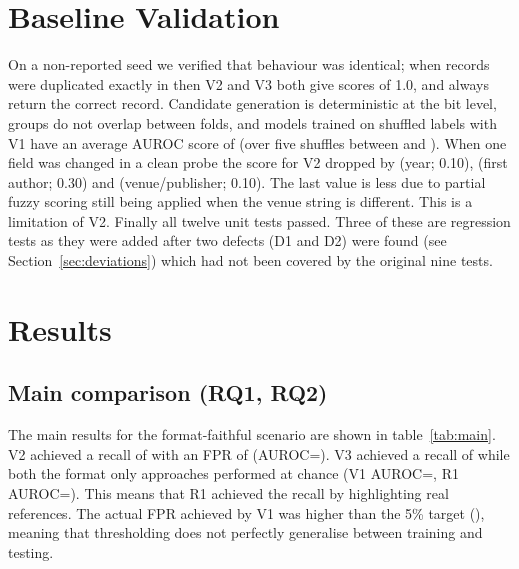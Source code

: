 \section{Baseline Validation}
On a non-reported seed we verified that behaviour was identical; when records were duplicated exactly in \NnKept{} then V2
and V3 both give scores of 1.0, and always return the correct record. Candidate generation is deterministic at the bit level,
groups do not overlap between folds, and models trained on shuffled labels with V1 have an average AUROC score of \NvalPermMean{}
(over five shuffles between \NvalPermMin{} and \NvalPermMax{}). When one field was changed in a clean probe the score for V2 dropped by
\NvalDropYear{} (year; 0.10), \NvalDropAuthor{} (first author; 0.30) and \NvalDropVenue{} (venue/publisher; 0.10). The last value is less due to partial fuzzy scoring
still being applied when the venue string is different. This is a limitation of V2. Finally all twelve unit tests passed. Three of these
are regression tests as they were added after two defects (D1 and D2) were found (see Section~\ref{sec:deviations}) which had not been
covered by the original nine tests.

\section{Results}
\subsection{Main comparison (RQ1, RQ2)}
The main results for the format-faithful scenario are shown in table~\ref{tab:main}.
V2 achieved a recall of \NVtwoRRec{} with an FPR of \NVtwoRFpr{} (AUROC=\NVtwoRAuroc{}). V3 achieved a recall of \NVthreeRRec{} while both the format only approaches performed at chance (V1 AUROC=\NVoneRAuroc{}, R1 AUROC=\NRoneAuroc{}). This means that R1 achieved the recall by highlighting \NRoneFpr{} real references.
The actual FPR achieved by V1 was higher than the 5\% target (\NVoneRFpr{}), meaning that thresholding does not perfectly generalise between training and testing.

\begin{table}[t]
\caption{Main comparison, format-faithful fabricator ($\rho_f{=}0.05$), complete index. Mean $\pm$ SD over 5 seeds. FPR is on genuine references; R-F1/F2/F3 are recall per defective family at the operating point; PPV assumes 2\% prevalence.}
\label{tab:main}
\centering\footnotesize

\end{table}

